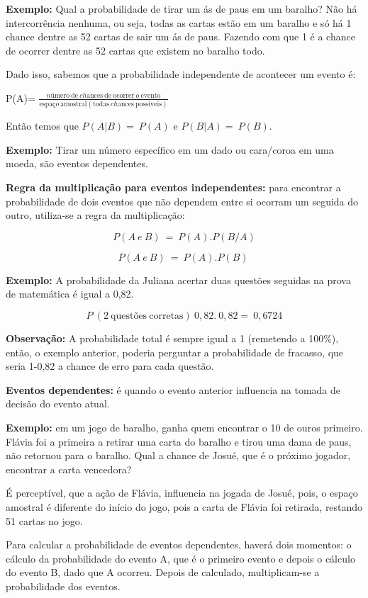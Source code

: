 {{{{{{{{{{{{{\textbf{Exemplo:} Qual a probabilidade de tirar um ás de paus em um
baralho? Não há intercorrência nenhuma, ou seja, todas as cartas estão
em um baralho e só há 1 chance dentre as 52 cartas de sair um ás de
paus. Fazendo com que 1 é a chance de ocorrer dentre as 52 cartas que
existem no baralho todo.

Dado isso, sabemos que a probabilidade independente de acontecer um
evento é:

P(A)=
\(\frac{nú\text{mero}\ \text{de}\ ch\text{ances}\ \text{de}\ \text{ocorrer}\ o\ \text{evento}}{\text{espa}ço\ \text{amostral}(\text{todas}\ ch\text{ances}\ \text{poss}í\text{veis})}\)

Então temos que \(P(A|B) = \ P(A)\) e \(P(B|A) = \ P(B)\).

\textbf{Exemplo:} Tirar um número específico em um dado ou cara/coroa em
uma moeda, são eventos dependentes.

\textbf{Regra da multiplicação para eventos independentes:} para
encontrar a probabilidade de dois eventos que não dependem entre si
ocorram um seguida do outro, utiliza-se a regra da multiplicação:

\[P(A\ e\ B)\  = \ P(A).P(B/A)\]

\[P(A\ e\ B)\  = \ P(A).P(B)\ \]

\textbf{Exemplo:} A probabilidade da Juliana acertar duas questões
seguidas na prova de matemática é igual a 0,82.

\[P\ (2\ \text{quest}õ\text{es}\ \text{corretas})\ 0,82.\ 0,82 = \ 0,6724\]

\textbf{Observação:} A probabilidade total é sempre igual a 1 (remetendo
a 100\%), então, o exemplo anterior, poderia perguntar a probabilidade
de fracasso, que seria 1-0,82 a chance de erro para cada questão.

\textbf{Eventos dependentes:} é quando o evento anterior influencia na
tomada de decisão do evento atual.

\textbf{Exemplo:} em um jogo de baralho, ganha quem encontrar o 10 de
ouros primeiro. Flávia foi a primeira a retirar uma carta do baralho e
tirou uma dama de paus, não retornou para o baralho. Qual a chance de
Josué, que é o próximo jogador, encontrar a carta vencedora?

É perceptível, que a ação de Flávia, influencia na jogada de Josué,
pois, o espaço amostral é diferente do início do jogo, pois a carta de
Flávia foi retirada, restando 51 cartas no jogo.

Para calcular a probabilidade de eventos dependentes, haverá dois
momentos: o cálculo da probabilidade do evento A, que é o primeiro
evento e depois o cálculo do evento B, dado que A ocorreu. Depois de
calculado, multiplicam-se a probabilidade dos eventos.

}}}}}}}}}}}}}
